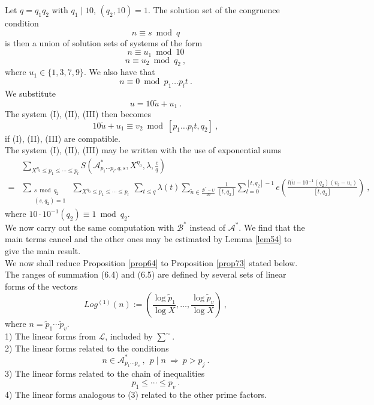 \documentclass{amsart}
\numberwithin{equation}{subsection}
\begin{document}
Let $q=q_1q_2$ with $q_1\mid 10$, $(q_2, 10)=1$. The solution set of the congruence condition 
$$n\equiv s \bmod q$$
is then a union of solution sets of systems of the form
\[
n\equiv u_1\bmod 10 \tag{I}
\]
\[
n\equiv u_2\bmod q_2\:, \tag{II}
\]
where $u_1\in\{1, 3, 7, 9\}$. We also have that
\[
n\equiv 0\bmod p_1\ldots p_l t\:. \tag{III}
\]
We substitute
$$u=10\tilde{u}+u_1\:.$$
The system (I), (II), (III) then becomes 
$$10\tilde{u}+u_1 \equiv v_2 \bmod [p_1\ldots p_l t, q_2]\:,$$
if (I), (II), (III) are compatible.\\
The system (I), (II), (III) may be written with the use of exponential sums
\begin{align*}
&\sum_{X^{\eta_0}\leq p_1\leq \cdots \leq p_l} S\left(\mathcal{A}^*_{p_1\cdots p_l, q, s}, X^{\eta_0}, \lambda, \frac{c}{q}\right)  \tag{7.1}\\
=& \sum_{\substack{s \bmod q_2 \\ (s, q_2)=1}} \ \sum_{X^{\eta_0}\leq p_1 \leq \cdots \leq p_l}\ \sum_{t\leq q} \lambda(t) \sum_{\tilde{n}\in\frac{\mathcal{B}^*-U}{10}} \frac{1}{[t, q_2]} \sum_{l=0}^{[t, q_2]-1} e\left( \frac{l(\tilde{u}-10^{-1}(q_2)(v_2-u_i)}{[t, q_2]}  \right)\:,
\end{align*}
where $10\cdot 10^{-1}(q_2) \equiv 1 \bmod q_2$.\\
We now carry out the same computation with $\mathcal{B}^*$ instead of $\mathcal{A}^*$. We find that the main terms cancel and the other ones may be estimated by Lemma \ref{lem54} to give the main result.\\
We now shall reduce Proposition \ref{prop64} to Proposition \ref{prop73} stated below. The ranges of summation (6.4) and (6.5) are defined by several sets of linear forms of the vectors
\[
Log^{(1)} (n) :=\left( \frac{\log \tilde{p}_1}{\log X} , \ldots,  \frac{\log \tilde{p}_v}{\log X}  \right)\:, \tag{7.2}
\]
where $n=\tilde{p}_1\cdots \tilde{p}_v$.\\
1) The linear forms from $\mathcal{L}$, included by $\sum^\sim$\:.\\
2) The linear forms related to the conditions 
$$n\in \mathcal{A}^*_{p_1\cdots p_v}\:,\ \ p\mid n\ \Rightarrow \ p>p_j\:.$$
3) The linear forms related to the chain of inequalities 
$$p_1\leq \cdots \leq p_v\:.$$
4) The linear forms analogous to (3) related to the other prime factors.
\end{document}
